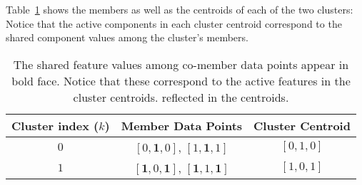 {Table~\ref{tab:cl-members} shows the members as well as the centroids of each of the two clusters: Notice that the active components in each cluster centroid correspond to the shared component values among the cluster's members.
\begin{table}[h]
\centering
\begin{tabular}{ccc}
Cluster index ($k$) & Member Data Points & Cluster Centroid \\ \hline
 $0$ &  $[0,\mathbf{1},0]$, $[1,\mathbf{1},1]$ & $[0,1,0]$\\
 $1$  & $[\mathbf{1},0,\mathbf{1}]$, $[\mathbf{1},1,\mathbf{1}]$ & $[1,0,1]$\\
 \end{tabular}
\label{tab:cl-members}
\caption{The shared feature values among co-member data points appear in bold face. Notice that these correspond to the active features in the cluster centroids.
reflected in the centroids.}
\end{table}	



%

}
